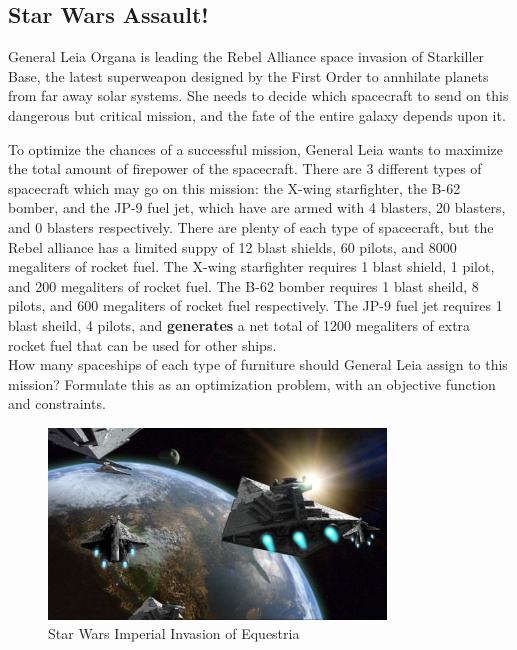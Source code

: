 \documentclass[12pt]{article}
\begin{document}
\subsection{Star Wars Assault!}
General Leia Organa is leading the Rebel Alliance space invasion of Starkiller Base, the latest superweapon designed by the First Order to annhilate planets from far away solar systems.  She needs to decide which spacecraft to send on this dangerous but critical mission, and the fate of the entire galaxy depends upon it.  

To optimize the chances of a successful mission, General Leia wants to maximize the total amount of firepower of the spacecraft.  There are 3 different types of spacecraft which may go on this mission: the X-wing starfighter, the B-62 bomber, and the JP-9 fuel jet, which have are armed with 4 blasters, 20 blasters, and 0 blasters respectively.  There are plenty of each type of spacecraft, but the Rebel alliance has a limited suppy of 12 blast shields, 60 pilots, and 8000 megaliters of rocket fuel.  The X-wing starfighter requires 1 blast shield, 1 pilot, and 200 megaliters of rocket fuel.  The B-62 bomber requires 1 blast sheild, 8 pilots, and 600 megaliters of rocket fuel respectively.  The JP-9 fuel jet requires 1 blast sheild, 4 pilots, and {\bf generates} a net total of 1200 megaliters of extra rocket fuel that can be used for other ships.  \\

How many spaceships of each type of furniture should General Leia assign to this mission?  Formulate this as an optimization problem, with an objective function and constraints.  

\begin{figure}[ht!]
\centering
    \includegraphics[width=0.8\textwidth]{pictures/Imperial_Invasion_of_Equestria}
    \caption{Star Wars Imperial Invasion of Equestria}
\end{figure}
\end{document}
